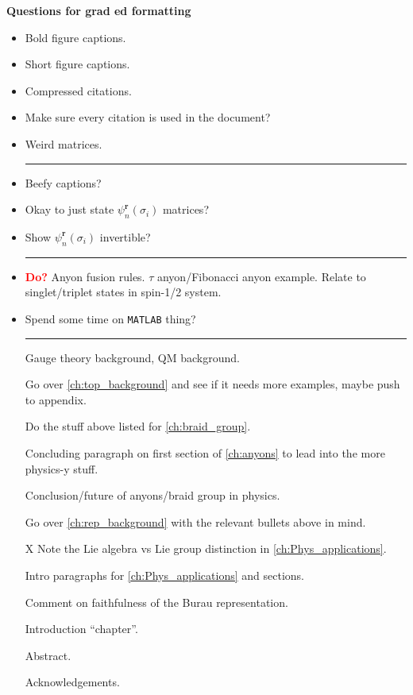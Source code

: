 \textbf{Questions for grad ed formatting}
\begin{itemize}
    \item Bold figure captions.
    \item Short figure captions.
    \item Compressed citations.
    \item Make sure every citation is used in the document?
    \item Weird matrices.
    
    \begin{center}\rule{.85\textwidth}{0.65pt}\end{center}
    
    \item Beefy captions?
    \item Okay to just state $\psi_n^\textbf{r}(\sigma_i)$ matrices?
    \item Show $\psi_n^\textbf{r}(\sigma_i)$ invertible?
    
    \begin{center}\rule{.85\textwidth}{0.65pt}\end{center}
    
    \item \textbf{\textcolor{red}{Do?}} Anyon fusion rules. $\tau$ anyon/Fibonacci anyon example. Relate to singlet/triplet states in spin-1/2 system.
    \item Spend some time on \texttt{MATLAB} thing?

    \begin{center}\rule{.85\textwidth}{0.65pt}\end{center}
    \item[\checkmark] Gauge theory background, QM background.
    \item[\checkmark] Go over \cref{ch:top_background} and see if it needs more examples, maybe push to appendix.
    \item[\checkmark] Do the stuff above listed for \cref{ch:braid_group}.
    \item[\checkmark] Concluding paragraph on first section of \cref{ch:anyons} to lead into the more physics-y stuff.
    \item[\checkmark] Conclusion/future of anyons/braid group in physics.
    \item[\checkmark] Go over \cref{ch:rep_background} with the relevant bullets above in mind.
    \item[X] Note the Lie algebra vs Lie group distinction in \cref{ch:Phys_applications}.
    \item[\checkmark] Intro paragraphs for \cref{ch:Phys_applications} and sections.
    \item[\checkmark] Comment on faithfulness of the Burau representation.
    \item[\checkmark] Introduction ``chapter''.
    \item[\qedsymbol] Abstract.
    \item[\qedsymbol] Acknowledgements.
\end{itemize}
